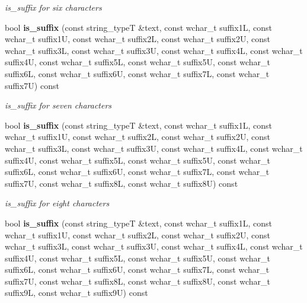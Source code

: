 \begin{DoxyCompactItemize}
\begin{DoxyCompactList}\small\item\em is\+\_\+suffix for six characters \end{DoxyCompactList}\item 
bool {\bf is\+\_\+suffix} (const string\+\_\+typeT \&text, const wchar\+\_\+t suffix1L, const wchar\+\_\+t suffix1U, const wchar\+\_\+t suffix2L, const wchar\+\_\+t suffix2U, const wchar\+\_\+t suffix3L, const wchar\+\_\+t suffix3U, const wchar\+\_\+t suffix4L, const wchar\+\_\+t suffix4U, const wchar\+\_\+t suffix5L, const wchar\+\_\+t suffix5U, const wchar\+\_\+t suffix6L, const wchar\+\_\+t suffix6U, const wchar\+\_\+t suffix7L, const wchar\+\_\+t suffix7U) const \label{classstemming_1_1stem_a79f18e256337d37054c80de470660a65}

\begin{DoxyCompactList}\small\item\em is\+\_\+suffix for seven characters \end{DoxyCompactList}\item 
bool {\bf is\+\_\+suffix} (const string\+\_\+typeT \&text, const wchar\+\_\+t suffix1L, const wchar\+\_\+t suffix1U, const wchar\+\_\+t suffix2L, const wchar\+\_\+t suffix2U, const wchar\+\_\+t suffix3L, const wchar\+\_\+t suffix3U, const wchar\+\_\+t suffix4L, const wchar\+\_\+t suffix4U, const wchar\+\_\+t suffix5L, const wchar\+\_\+t suffix5U, const wchar\+\_\+t suffix6L, const wchar\+\_\+t suffix6U, const wchar\+\_\+t suffix7L, const wchar\+\_\+t suffix7U, const wchar\+\_\+t suffix8L, const wchar\+\_\+t suffix8U) const \label{classstemming_1_1stem_aa18daf5b33d220d93dff22d6e591edd6}

\begin{DoxyCompactList}\small\item\em is\+\_\+suffix for eight characters \end{DoxyCompactList}\item 
bool {\bf is\+\_\+suffix} (const string\+\_\+typeT \&text, const wchar\+\_\+t suffix1L, const wchar\+\_\+t suffix1U, const wchar\+\_\+t suffix2L, const wchar\+\_\+t suffix2U, const wchar\+\_\+t suffix3L, const wchar\+\_\+t suffix3U, const wchar\+\_\+t suffix4L, const wchar\+\_\+t suffix4U, const wchar\+\_\+t suffix5L, const wchar\+\_\+t suffix5U, const wchar\+\_\+t suffix6L, const wchar\+\_\+t suffix6U, const wchar\+\_\+t suffix7L, const wchar\+\_\+t suffix7U, const wchar\+\_\+t suffix8L, const wchar\+\_\+t suffix8U, const wchar\+\_\+t suffix9L, const wchar\+\_\+t suffix9U) const \label{classstemming_1_1stem_ab905150e381f068c6b04eba851bb6263}


\end{DoxyCompactItemize}
